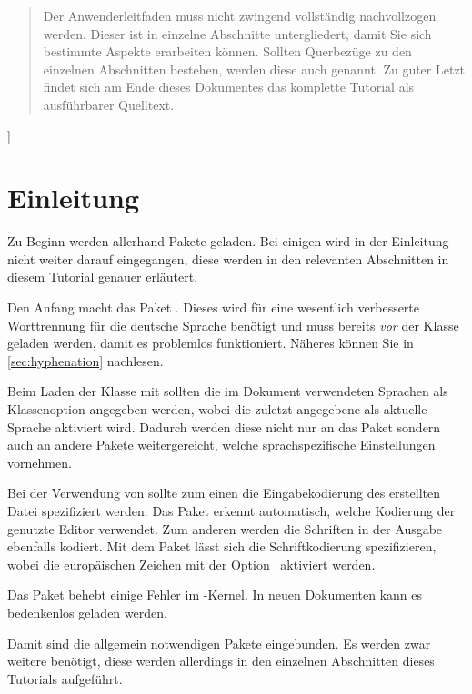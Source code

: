 \documentclass[%
  english,ngerman,%
  geometry=no,DIV=12,automark,%
]{tudscrartcl}
\begin{document}
\begin{abstract}
  Der Anwenderleitfaden muss nicht zwingend vollständig nachvollzogen werden. 
  Dieser ist in einzelne Abschnitte untergliedert, damit Sie sich bestimmte 
  Aspekte erarbeiten können. Sollten Querbezüge zu den einzelnen Abschnitten 
  bestehen, werden diese auch genannt. Zu guter Letzt findet sich am Ende 
  dieses Dokumentes das komplette Tutorial als ausführbarer Quelltext. 
  \end{abstract}
]
\tableofcontents
\listoffigures
\listoftables



\section{Einleitung}
\label{sec:introduction}
Zu Beginn werden allerhand Pakete geladen. Bei einigen wird in der Einleitung 
nicht weiter darauf eingegangen, diese werden in den relevanten Abschnitten in 
diesem Tutorial genauer erläutert. 

Den Anfang macht das Paket . Dieses wird für eine wesentlich 
verbesserte Worttrennung für die deutsche Sprache benötigt und muss bereits 
\emph{vor} der Klasse geladen werden, damit es problemlos funktioniert. Näheres 
können Sie in \autoref{sec:hyphenation} nachlesen.
%
\begin{Preamble}
\RequirePackage[ngerman=ngerman-x-latest]{hyphsubst}
\end{Preamble}
%
Beim Laden der Klasse mit  sollten die im Dokument 
verwendeten Sprachen als Klassenoption angegeben werden, wobei die zuletzt 
angegebene als aktuelle Sprache aktiviert wird. Dadurch werden diese nicht nur 
an das Paket  sondern auch an andere Pakete weitergereicht, 
welche sprachspezifische Einstellungen vornehmen.
%
%
Bei der Verwendung von  sollte zum einen die Eingabekodierung 
des erstellten Datei spezifiziert werden. Das Paket  erkennt 
automatisch, welche Kodierung der genutzte Editor verwendet. Zum anderen werden 
die Schriften in der Ausgabe ebenfalls kodiert. Mit dem Paket  
lässt sich die Schriftkodierung spezifizieren, wobei die europäischen Zeichen 
mit der Option~ aktiviert werden.
%
\begin{Preamble}
\usepackage{selinput}
\usepackage[T1]{fontenc}

\end{Preamble}
%
Das Paket  behebt einige Fehler im -Kernel. 
In neuen Dokumenten kann es bedenkenlos geladen werden.
%
\begin{Preamble}
\usepackage{fixltx2e}

\end{Preamble}
%
Damit sind die allgemein notwendigen Pakete eingebunden. Es werden zwar weitere 
benötigt, diese werden allerdings in den einzelnen Abschnitten dieses Tutorials 
aufgeführt.
\end{document}
